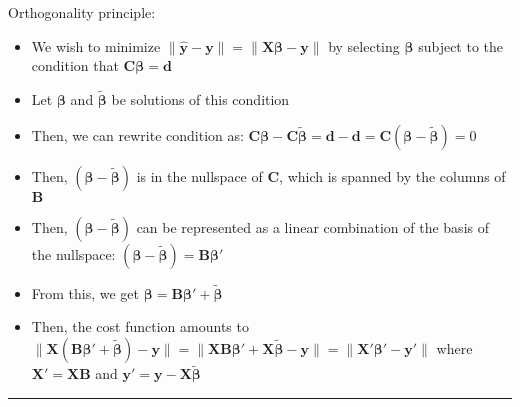 Orthogonality principle:
\begin{itemize}
    \item We wish to minimize $\| \hat{\boldsymbol{y}} - \boldsymbol{y} \| = \| \boldsymbol{X}\boldsymbol{\beta} - \boldsymbol{y} \|$ by selecting $\boldsymbol{\beta}$ subject to the condition that $\boldsymbol{C}\boldsymbol{\beta} = \boldsymbol{d}$
    \item Let $\boldsymbol{\beta}$ and $\tilde{\boldsymbol{\beta}}$ be solutions of this condition
    \item Then, we can rewrite condition as: $\boldsymbol{C}\boldsymbol{\beta} - \boldsymbol{C}\tilde{\boldsymbol{\beta}} = \boldsymbol{d} - \boldsymbol{d} = \boldsymbol{C}(\boldsymbol{\beta} - \tilde{\boldsymbol{\beta}}) = 0$
    \item Then, $(\boldsymbol{\beta} - \tilde{\boldsymbol{\beta}})$ is in the nullspace of $\boldsymbol{C}$, which is spanned by the columns of $\boldsymbol{B}$
    \item Then, $(\boldsymbol{\beta} - \tilde{\boldsymbol{\beta}})$ can be represented as a linear combination of the basis of the nullspace: $(\boldsymbol{\beta} - \tilde{\boldsymbol{\beta}}) = \boldsymbol{B}\boldsymbol{\beta}'$
    \item From this, we get  $\boldsymbol{\beta}= \boldsymbol{B}\boldsymbol{\beta}' +\tilde{\boldsymbol{\beta}}$
    \item Then, the cost function amounts to $\| \boldsymbol{X}(\boldsymbol{B}\boldsymbol{\beta}' +\tilde{\boldsymbol{\beta}}) - \boldsymbol{y} \| = \| \boldsymbol{X} \boldsymbol{B} \boldsymbol{\beta}' + \boldsymbol{X}\tilde{\boldsymbol{\beta}} - \boldsymbol{y} \| = \| \boldsymbol{X}'\boldsymbol{\beta}' - \boldsymbol{y}' \|$ where $\boldsymbol{X}' = \boldsymbol{X}\boldsymbol{B}$ and $\boldsymbol{y}' = \boldsymbol{y} - \boldsymbol{X}\tilde{\boldsymbol{\beta}}$
\end{itemize}

{\color{lightgray}\hrule height 0.001mm}

